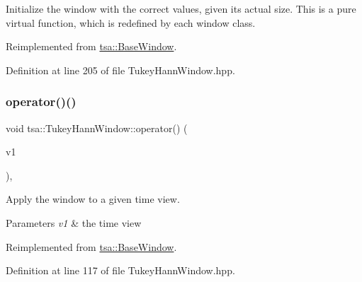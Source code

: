 Initialize the window with the correct values, given its actual size. This is a pure virtual function, which is redefined by each window class. 

Reimplemented from \hyperlink{classtsa_1_1_base_window_aa74b29105d94caa521d308198e8e6643}{tsa\+::\+Base\+Window}.



Definition at line 205 of file Tukey\+Hann\+Window.\+hpp.

\mbox{\label{classtsa_1_1_tukey_hann_window_a2a10c0c94b2c5ebbc1db201371074295}} 
\subsubsection{\texorpdfstring{operator()()}{operator()()}\hspace{0.1cm}{\footnotesize\ttfamily [1/2]}}
{\footnotesize\ttfamily void tsa\+::\+Tukey\+Hann\+Window\+::operator() (\begin{DoxyParamCaption}\item[{\hyperlink{namespacetsa_ac599574bcc094eda25613724b8f3ca9e}{Seq\+View\+Double} \&}]{v1 }\end{DoxyParamCaption})\hspace{0.3cm}{\ttfamily [inline]}, {\ttfamily [virtual]}}

Apply the window to a given time view.


\begin{DoxyParams}{Parameters}
{\em v1} & the time view \\
\hline
\end{DoxyParams}


Reimplemented from \hyperlink{classtsa_1_1_base_window_a05d9edb95dc01840a1b2df78dfa3a8c1}{tsa\+::\+Base\+Window}.



Definition at line 117 of file Tukey\+Hann\+Window.\+hpp.

\mbox{\label{classtsa_1_1_tukey_hann_window_af889453b564781f9eca6993f2fd95646}} 
